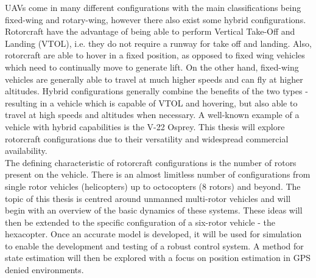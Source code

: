 UAVs come in many different configurations with the main classifications being fixed-wing and rotary-wing, however there also exist some hybrid configurations. Rotorcraft have the advantage of being able to perform Vertical Take-Off and Landing (VTOL), i.e. they do not require a runway for take off and landing. Also, rotorcraft are able to hover in a fixed position, as opposed to fixed wing vehicles which need to continually move to generate lift. On the other hand, fixed-wing vehicles are generally able to travel at much higher speeds and can fly at higher altitudes. Hybrid configurations generally combine the benefits of the two types - resulting in a vehicle which is capable of VTOL and hovering, but also able to travel at high speeds and altitudes when necessary. A well-known example of a vehicle with hybrid capabilities is the V-22 Osprey. This thesis will explore rotorcraft configurations due to their versatility and widespread commercial availability.\\

The defining characteristic of rotorcraft configurations is the number of rotors present on the vehicle. There is an almost limitless number of configurations from single rotor vehicles (helicopters) up to octocopters (8 rotors) and beyond. The topic of this thesis is centred around unmanned multi-rotor vehicles and will begin with an overview of the basic dynamics of these systems. These ideas will then be extended to the specific configuration of a six-rotor vehicle - the hexacopter. Once an accurate model is developed, it will be used for simulation to enable the development and testing of a robust control system. A method for state estimation will then be explored with a focus on position estimation in GPS denied environments.



